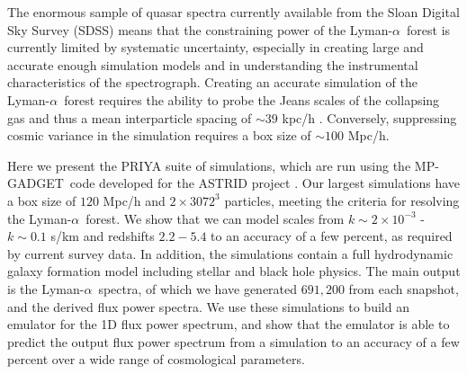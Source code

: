 \documentclass[a4paper,11pt]{article}
\newcommand{\Lya}{Lyman-$\alpha$}
\newcommand{\mpgadget}{{\small MP-GADGET}}
\begin{document}
The enormous sample of quasar spectra currently available from the Sloan Digital Sky Survey (SDSS) means that the constraining power of the \Lya~forest is currently limited by systematic uncertainty, especially in creating large and accurate enough simulation models and in understanding the instrumental characteristics of the spectrograph.
Creating an accurate simulation of the \Lya~forest requires the ability to probe the Jeans scales of the collapsing gas and thus a mean interparticle spacing of $\sim 39$ kpc/h \cite{Borde:2014}.
 Conversely, suppressing cosmic variance in the simulation requires a box size of $\sim 100$ Mpc/h.

Here we present the PRIYA suite of simulations, which are run using the \mpgadget~code developed for the ASTRID project \cite{Ni:2021, Bird:2022}. Our largest simulations have a box size of $120$ Mpc/h and $2\times 3072^3$ particles, meeting the criteria for resolving the \Lya~forest.
We show that we can model scales from $k \sim 2\times 10^{-3}$ - $k \sim 0.1$ s/km and redshifts $2.2 - 5.4$ to an accuracy of a few percent, as required by current survey data. In addition, the simulations contain a full hydrodynamic galaxy formation model including stellar and black hole physics. The main output is the \Lya~spectra, of which we have generated $691,200$ from each snapshot, and the derived flux power spectra.
We use these simulations to build an emulator for the 1D flux power spectrum, and show that the emulator is able to predict the output flux power spectrum from a simulation to an accuracy of a few percent over a wide range of cosmological parameters.
\end{document}
